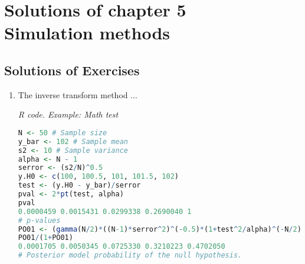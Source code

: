 \chapter{Solutions of chapter 5\\
Simulation methods}\label{chap5}

\section{Solutions of Exercises}\label{sec51}
\begin{enumerate}[leftmargin=*]
\item The inverse transform method ...


\begin{tcolorbox}[enhanced,width=4.67in,center upper,
	fontupper=\large\bfseries,drop shadow southwest,sharp corners]
	\textit{R code. Example: Math test}
\begin{VF}
\begin{lstlisting}[language=R]
N <- 50 # Sample size
y_bar <- 102 # Sample mean 
s2 <- 10 # Sample variance
alpha <- N - 1
serror <- (s2/N)^0.5 
y.H0 <- c(100, 100.5, 101, 101.5, 102)
test <- (y.H0 - y_bar)/serror
pval <- 2*pt(test, alpha)
pval
0.0000459 0.0015431 0.0299338 0.2690040 1
# p-values
PO01 <- (gamma(N/2)*((N-1)*serror^2)^(-0.5)*(1+test^2/alpha)^(-N/2))/(gamma(1/2)*gamma((N-1)/2))
PO01/(1+PO01)
0.0001705 0.0050345 0.0725330 0.3210223 0.4702050
# Posterior model probability of the null hypothesis.
\end{lstlisting}
\end{VF}
\end{tcolorbox}
\end{enumerate}